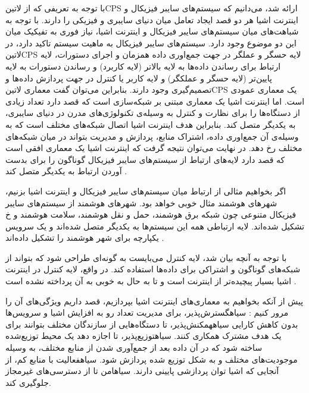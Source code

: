با توجه به تعریفی که از ‌لاتین{CPS} ارائه شد، می‌دانیم که سیستم‌های سایبر فیزیکال و اینترنت اشیا هر دو قصد ایجاد تعامل میان دنیای سایبری و فیزیکی را دارند.
با توجه به شباهت‌های میان سیستم‌های سایبر فیزیکال و اینترنت اشیا، نیاز فوری به تفیکیک میان این دو موضوع وجود دارد.
سیستم‌های سایبر فیزیکال به ماهیت سیستم تاکید دارد، در ‌لاتین{CPS} لایه حسگر و عملگر در جهت جمع‌اوری داده همزمان و اجرای دستورات،
لایه ارتباط برای رساندن داده‌ها به لایه بالاتر (لایه کاربرد) و رساندن دستورات به لایه پایین‌تر (لایه حسگر و عملکگر) و لایه کاربر یا کنترل در جهت پردازش داده‌ها
و تصمیم‌گیری وجود دارند. بنابراین می‌توان گفت معماری ‌لاتین{CPS} یک معماری عمودی است.
اما اینترنت اشیا یک معماری مبتنی بر شبکه‌سازی است که قصد دارد تعداد زیادی از دستگاه‌ها را برای نظارت و کنترل به وسیله‌ی تکنولوژی‌های مدرن در دنیای سایبری، به یکدیگر متصل کند.
بنابراین هدف اینترنت اشیا اتصال شبکه‌های مختلف است که به وسیله‌ی آن جمع‌اوری داده، اشتراک منابع، پردازش و مدیریت بتواند در میان شبکه‌های مختلف رخ دهد.
در نهایت می‌توان نتیجه گرفت که اینترنت اشیا یک معماری افقی است که قصد دارد لایه‌های ارتباط از سیستم‌های سایبر فیزیکال گوناگون را برای بدست آوردن ارتباط به یکدیگر متصل کند
.

اگر بخواهیم مثالی از ارتباط میان سیستم‌های سایبر فیزیکال و اینترنت اشیا بزنیم، شهرهای هوشمند مثال خوبی خواهد بود. شهرهای هوشمند از سیستم‌های سایبر فیزیکال متنوعی چون
شبکه برق هوشمند، حمل و نقل هوشمند، سلامت هوشمند و ‌خ تشکیل شده‌اند. لایه ارتباطی همه این سیستم‌ها به یکدیگر متصل شده‌اند و یک سرویس یکپارچه برای شهر هوشمند را
تشکیل داده‌اند
.

با توجه به آنچه بیان شد، لایه کنترل می‌بایست به گونه‌ای طراحی شود که بتواند از شبکه‌های گوناگون و اشتراکی برای داده‌ها استفاده کند.
در واقع، لایه کنترل در اینترنت اشیا بسیار پیچیده‌تر از اینترنت است و تا به حال به خوبی به آن پرداخته نشده است
.


پیش از آنکه بخواهیم به معماری‌های اینترنت اشیا بپردازیم، قصد داریم ویژگی‌های آن را مرور کنیم
:
 ‌سیاه{گسترش‌پذیر}، برای مدیریت تعداد رو به افزایش اشیا و سرویس‌ها بدون کاهش کارایی
 ‌سیاه{همکنش‌پذیر}، تا دستگاه‌هایی از سازندگان مختلف بتوانند برای یک هدف مشترک همکاری کنند.
 ‌سیاه{توزیع‌پذیر}، تا اجازه دهد یک محیط توزیع‌شده ساخته شود که در آن داده بعد از جمع‌آوری شدن از منابع مختلف، به وسیله موجودیت‌های مختلف و به شکل توزیع شده پردازش شود.
 ‌سیاه{فعالیت با منابع کم}، از آنجایی که اشیا توان پردازشی پایینی دارند.
 ‌سیاه{امن} تا از دسترسی‌های غیرمجاز جلوگیری کند.

